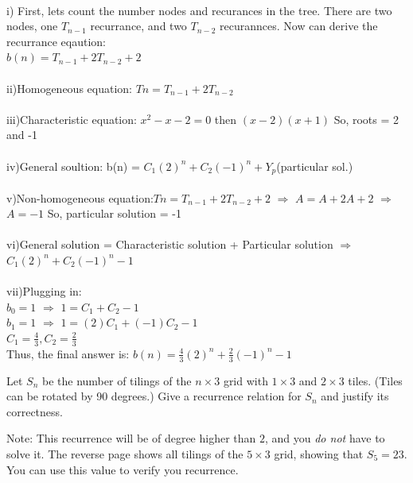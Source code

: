 \documentclass[11pt]{article}
\begin{document}
\pagebreak
\begin{solution}
	\\i) First, lets count the number nodes and recurances in the tree. There are
	two nodes, one $T_{n-1}$ recurrance, and two $T_{n-2}$ recurannces. Now can
	derive the recurrance eqaution: \\$b(n) = T_{n-1} + 2T_{n-2} + 2$
	\\
	\\ii)Homogeneous equation: $Tn = T_{n-1} + 2T_{n-2}$
	\\
	\\iii)Characteristic equation: $x^{2} - x - 2 = 0$ then $(x-2)(x+1)$
	So, roots = 2 and -1
	\\
	\\iv)General soultion: b(n) = $C_{1}(2)^{n} + C_{2}(-1)^{n} + Y_{p}$(particular sol.)
	\\
	\\v)Non-homogeneous equation:$Tn = T_{n-1} + 2T_{n-2} + 2$ $\Rightarrow$
	$A=A+ 2A + 2 $ $\Rightarrow$ $A = -1$ So, particular solution = -1
	\\
	\\vi)General solution = Characteristic solution + Particular solution $\Rightarrow$
	$C_{1}(2)^{n} + C_{2}(-1)^{n} - 1$
	\\
	\\vii)Plugging in:
	\\$b_0 = 1$ $\Rightarrow$ $1 = C_{1} + C_{2} - 1 $
	\\$b_1 = 1$ $\Rightarrow$ $1 = (2)C_{1} + (-1)C_{2} - 1 $
	\\$C_{1} = \frac{4}{3} , C_{2} = \frac{2}{3}$
	\\Thus, the final answer is: $b(n) = \frac{4}{3}(2)^{n} + \frac{2}{3}(-1)^{n} - 1$
\end{solution}

\pagebreak
\begin{problem}
	Let $S_n$ be the number of tilings of the $n\times 3$ grid with
$1\times 3$ and $2\times 3$ tiles. (Tiles can be rotated by 90 degrees.)
 Give a recurrence relation
for $S_n$ and justify its correctness.

Note: This recurrence will be of degree higher than $2$, and you
\emph{do not} have to solve it. The reverse page shows all tilings of
the $5\times 3$ grid, showing that $S_5 = 23$. You can use this value to
verify you recurrence.
\end{problem}

\end{document}
